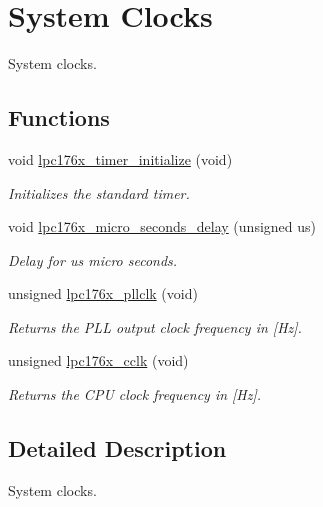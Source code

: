 \hypertarget{group__lpc176x__clock}{}\section{System Clocks}
\label{group__lpc176x__clock}


System clocks.  


\subsection*{Functions}
\begin{DoxyCompactItemize}
\item 
void \mbox{\hyperlink{group__lpc176x__clock_ga36b647bb6e1c61bb2b688eab520effc7}{lpc176x\+\_\+timer\+\_\+initialize}} (void)
\begin{DoxyCompactList}\small\item\em Initializes the standard timer. \end{DoxyCompactList}\item 
void \mbox{\hyperlink{group__lpc176x__clock_gac77b85bc6bddf82f57b59d4c340fbd24}{lpc176x\+\_\+micro\+\_\+seconds\+\_\+delay}} (unsigned us)
\begin{DoxyCompactList}\small\item\em Delay for {\itshape us} micro seconds. \end{DoxyCompactList}\item 
unsigned \mbox{\hyperlink{group__lpc176x__clock_ga1838b91b836f6ac5a926f2976cc3ff91}{lpc176x\+\_\+pllclk}} (void)
\begin{DoxyCompactList}\small\item\em Returns the P\+LL output clock frequency in \mbox{[}Hz\mbox{]}. \end{DoxyCompactList}\item 
unsigned \mbox{\hyperlink{group__lpc176x__clock_gabd5c49363477314782dd3ce3521962b1}{lpc176x\+\_\+cclk}} (void)
\begin{DoxyCompactList}\small\item\em Returns the C\+PU clock frequency in \mbox{[}Hz\mbox{]}. \end{DoxyCompactList}\end{DoxyCompactItemize}


\subsection{Detailed Description}
System clocks. 



